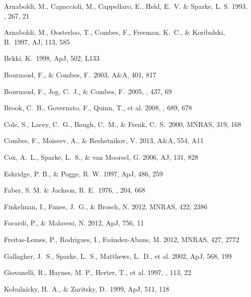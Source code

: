 \documentclass[11pt,twoside]{article}
\begin{document}
\begin{thebibliography}{}

 {Arnaboldi}, 
M., {Capaccioli}, M., {Cappellaro}, E., {Held}, E.~V. \& {Sparke},
L. S. 1993, \aap, 267, 21

 Arnaboldi, M., 
Oosterloo, T., Combes, F., Freeman, K.~C., \& Koribalski, B.\ 1997,
AJ, 113, 585

 Bekki, K.\ 1998, ApJ, 502, L133

 Bournaud, F., 
\& Combes, F.\ 2003, A\&A, 401, 817

 Bournaud, F., 
Jog, C.~J., \& Combes, F.\ 2005, \aap, 437, 69

 Brook, C.~B., Governato, 
F., Quinn, T., et al.  2008, \apj, 689, 678

 Cole, S., Lacey, C.~G., 
Baugh, C.~M., \& Frenk, C.~S.\ 2000, MNRAS, 319, 168

 Combes, F., Moiseev, 
A., \& Reshetnikov, V. 2013, A\&A, 554, A11

 Cox, A.~L., Sparke, L.~S., 
\& van Moorsel, G. 2006, AJ, 131, 828

 Eskridge, P. B., \& 
Pogge, R. W. 1997, ApJ, 486, 259

 Faber, S. M. \& Jackson, 
R. E.\ 1976, \apj, 204, 668

 Finkelman, I., 
Funes, J.~G., \& Brosch, N. 2012, MNRAS, 422, 2386

 Focardi, P., 
\& Malavesi, N. 2012, ApJ, 756, 11
 
 Freitas-Lemes, 
P., Rodrigues, I., Fa\'undez-Abans, M. 2012, MNRAS, 427, 2772

 Gallagher, J.~S., 
Sparke, L.~S., Matthews, L.~D., et al.  2002, ApJ, 568, 199

 Giovanelli, R., 
Haynes, M. P., Herter, T., et al. 1997, \aj, 113, 22

 Kobulnicky, H.~A., 
\& Zaritsky, D.\ 1999, ApJ, 511, 118


\end{thebibliography}
\end{document}
